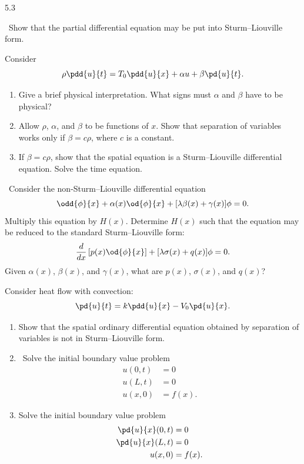 \begin{exercises}{5.3}

\item\starred\ Show that the partial differential equation may be put into Sturm--Liouville form.

\item Consider
\[
\rho\pdd{u}{t} = T_0\pdd{u}{x} + \alpha u + \beta\pd{u}{t}.
\]
\begin{enumerate}
\item Give a brief physical interpretation.  What signs must $\alpha$ and $\beta$ have to be physical?
\item Allow $\rho$, $\alpha$, and $\beta$ to be functions of $x$.  Show that separation of variables works only if $\beta = c\rho$, where $c$ is a constant.
\item If $\beta = c\rho$, show that the spatial equation is a Sturm--Liouville differential equation.  Solve the time equation.
\end{enumerate}

\item\starred\ Consider the non-Sturm--Liouville differential equation
\[
\odd{\phi}{x} + \alpha(x)\od{\phi}{x} + [\lambda\beta(x) + \gamma(x)]\phi = 0.
\]
Multiply this equation by $H(x)$.  Determine $H(x)$ such that the equation may be reduced to the standard Sturm--Liouville form:
\[
\frac{d}{d x}\left[p(x)\od{\phi}{x}\right] + [\lambda\sigma(x) + q(x)]\phi = 0.
\]
Given $\alpha(x)$, $\beta(x)$, and $\gamma(x)$, what are $p(x)$, $\sigma(x)$, and $q(x)$?

\item Consider heat flow with convection:
\[
\pd{u}{t} = k\pdd{u}{x} - V_0\pd{u}{x}.
\]
\begin{enumerate}
\item Show that the spatial ordinary differential equation obtained by separation of variables is not in Sturm--Liouville form.
\item\starred\ Solve the initial boundary value problem
\begin{align*}
u(0,t) &= 0 \\
u(L,t) &= 0 \\
u(x,0) &= f(x).
\end{align*}
\item Solve the initial boundary value problem
\begin{align*}
\pd{u}{x}(0,t) &= 0 \\
\pd{u}{x}(L,t) &= 0 \\
u(x,0) &= f(x).
\end{align*}
\end{enumerate}


\end{exercises}

